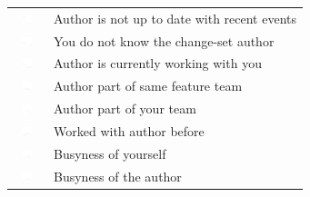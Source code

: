 \documentclass[12pt,oneside]{book}
\begin{document}
\begin{table}[t!]
\begin{tabular}{ll}
\vspace{-2pt}\includegraphics[height=10px, width=30px]{figures/sparkles/change-author-is-not-up-to-date-with-recent-events.pdf} & Author is not up to date with recent events\\
\vspace{-2pt}\includegraphics[height=10px, width=30px]{figures/sparkles/don-t-know-the-change-author.pdf} & You do not know the change-set author \\
\vspace{-2pt}\includegraphics[height=10px, width=30px]{figures/sparkles/currently-working-with-the-change-author.pdf} & Author is currently working with you\\
\vspace{-2pt}\includegraphics[height=10px, width=30px]{figures/sparkles/change-author-part-of-the-same-feature-team.pdf} & Author part of same feature team\\
\vspace{-2pt}\includegraphics[height=10px, width=30px]{figures/sparkles/team-of-change-author.pdf} & Author part of your team\\
\vspace{-2pt}\includegraphics[height=10px, width=30px]{figures/sparkles/worked-with-change-author-in-the-past.pdf} & Worked with author before\\
\vspace{-2pt}\includegraphics[height=10px, width=30px]{figures/sparkles/busyness-of-yourself} & Busyness of yourself\\
\vspace{-2pt}\includegraphics[height=10px, width=30px]{figures/sparkles/busyness-of-the-change-author} & Busyness of the author\\

\end{tabular}
\end{table}
\end{document}
